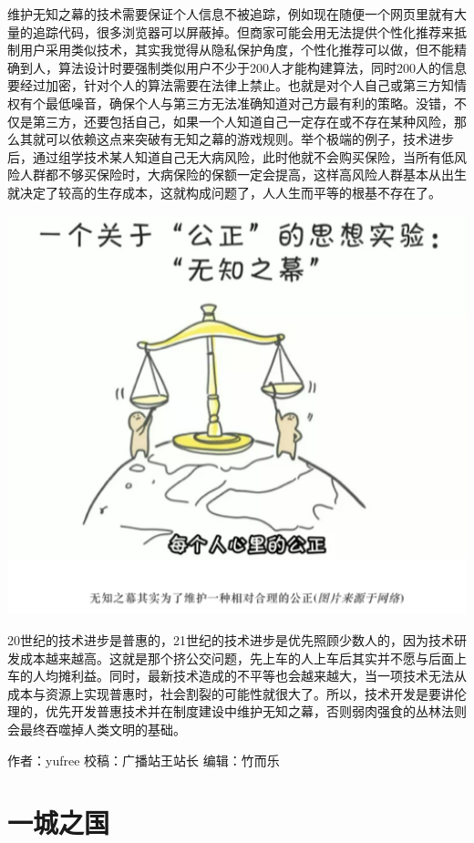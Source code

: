 \documentclass[
]{book}
\begin{document}
维护无知之幕的技术需要保证个人信息不被追踪，例如现在随便一个网页里就有大量的追踪代码，很多浏览器可以屏蔽掉。但商家可能会用无法提供个性化推荐来抵制用户采用类似技术，其实我觉得从隐私保护角度，个性化推荐可以做，但不能精确到人，算法设计时要强制类似用户不少于200人才能构建算法，同时200人的信息要经过加密，针对个人的算法需要在法律上禁止。也就是对个人自己或第三方知情权有个最低噪音，确保个人与第三方无法准确知道对己方最有利的策略。没错，不仅是第三方，还要包括自己，如果一个人知道自己一定存在或不存在某种风险，那么其就可以依赖这点来突破有无知之幕的游戏规则。举个极端的例子，技术进步后，通过组学技术某人知道自己无大病风险，此时他就不会购买保险，当所有低风险人群都不够买保险时，大病保险的保额一定会提高，这样高风险人群基本从出生就决定了较高的生存成本，这就构成问题了，人人生而平等的根基不存在了。　

\includegraphics[width=6.67in]{images/wuzhi4}

20世纪的技术进步是普惠的，21世纪的技术进步是优先照顾少数人的，因为技术研发成本越来越高。这就是那个挤公交问题，先上车的人上车后其实并不愿与后面上车的人均摊利益。同时，最新技术造成的不平等也会越来越大，当一项技术无法从成本与资源上实现普惠时，社会割裂的可能性就很大了。所以，技术开发是要讲伦理的，优先开发普惠技术并在制度建设中维护无知之幕，否则弱肉强食的丛林法则会最终吞噬掉人类文明的基础。

作者：yufree
校稿：广播站王站长
编辑：竹而乐

\hypertarget{ux4e00ux57ceux4e4bux56fd}{%
\section{一城之国}\label{ux4e00ux57ceux4e4bux56fd}}
\end{document}
